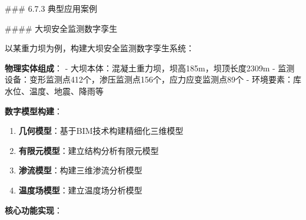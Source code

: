 \#\#\# 6.7.3 典型应用案例

\#\#\#\# 大坝安全监测数字孪生

以某重力坝为例，构建大坝安全监测数字孪生系统：

\textbf{物理实体组成}： - 大坝本体：混凝土重力坝，坝高185m，坝顶长度2309m - 监测设备：变形监测点412个，渗压监测点156个，应力应变监测点89个 - 环境要素：库水位、温度、地震、降雨等

\textbf{数字模型构建}：

\begin{enumerate}
\def\labelenumi{\arabic{enumi}.}
\tightlist
\item
  \textbf{几何模型}：基于BIM技术构建精细化三维模型
\item
  \textbf{有限元模型}：建立结构分析有限元模型
\item
  \textbf{渗流模型}：构建三维渗流分析模型
\item
  \textbf{温度场模型}：建立温度场分析模型
\end{enumerate}

\textbf{核心功能实现}：


